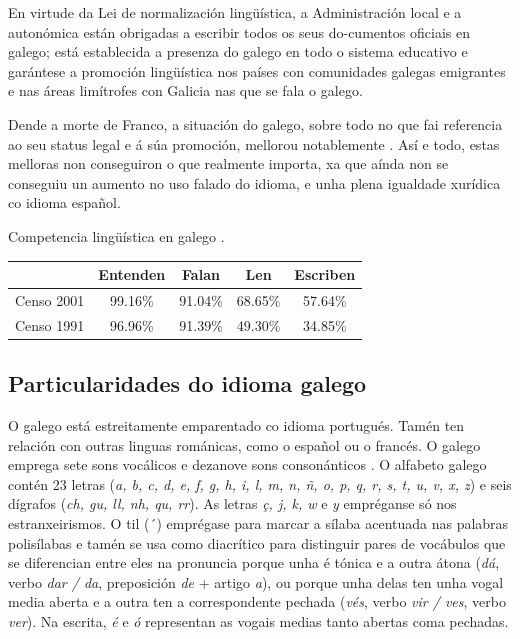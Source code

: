 \begin{multicols}{2}
En virtude da Lei de normalización lingüística, a Administración local e a autonómica están obrigadas a escribir todos os seus do-cumentos oficiais en galego; está establecida a presenza do galego en todo o sistema educativo e garántese a promoción lingüística nos países con comunidades galegas emigrantes e nas áreas limítrofes con Galicia nas que se fala o galego. 

Dende a morte de Franco, a situación do galego, sobre todo no que fai referencia ao seu status legal e á súa promoción, mellorou notablemente \cite{GAL-Nota7}. Así e todo, estas melloras non conseguiron o que realmente importa, xa que aínda non se conseguiu un aumento no uso falado do idioma, e unha plena igualdade xurídica co idioma español.

Competencia lingüística en galego \cite{GAL-Nota8}.

\begin{tabular}{|c|c|c|c|c|}
\hline  & Entenden & Falan & Len & Escriben \\ 
\hline Censo 2001 & 99.16\% & 91.04\% & 68.65\% & 57.64\% \\ 
\hline Censo 1991 & 96.96\% & 91.39\% & 49.30\% & 34.85\% \\ 
\hline 
\end{tabular} 


\subsection{Particularidades do idioma galego}

   O galego está estreitamente emparentado co idioma portugués. Tamén ten relación con outras linguas románicas, como o español ou o francés. O galego emprega sete sons vocálicos e dezanove sons consonánticos \cite{GAL-Nota9}. O alfabeto galego contén 23 letras (\textit{a, b, c, d, e, f, g, h, i, l, m, n, ñ, o, p, q, r, s, t, u, v, x, z}) e seis dígrafos (\textit{ch, gu, ll, nh, qu, rr}). As letras \textit{ç, j, k, w} e \textit{y} empréganse só nos estranxeirismos. O til (´) emprégase para marcar a sílaba acentuada nas palabras polisílabas e tamén se usa como diacrítico para distinguir pares de vocábulos que se diferencian entre eles na pronuncia porque unha é tónica e a outra átona (\textit{dá}, verbo \textit{dar / da}, preposición \textit{de} + artigo \textit{a}), ou porque unha delas ten unha vogal media aberta e a outra ten a correspondente pechada (\textit{vés}, verbo \textit{vir / ves}, verbo \textit{ver}). Na escrita, \textit{é} e \textit{ó} representan as vogais medias tanto abertas coma pechadas.



\end{multicols}
